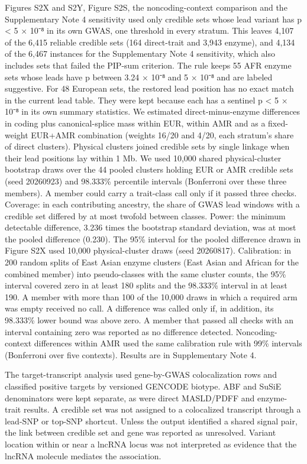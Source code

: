 Figures S2X and S2Y, Figure S2S, the noncoding-context comparison and the Supplementary Note 4 sensitivity used only credible sets whose lead variant has p \textless{} 5 × 10⁻⁸ in its own GWAS, one threshold in every stratum. This leaves 4,107 of the 6,415 reliable credible sets (164 direct-trait and 3,943 enzyme), and 4,134 of the 6,467 instances for the Supplementary Note 4 sensitivity, which also includes sets that failed the PIP-sum criterion. The rule keeps 55 AFR enzyme sets whose leads have p between 3.24 × 10⁻⁸ and 5 × 10⁻⁸ and are labeled suggestive. For 48 European sets, the restored lead position has no exact match in the current lead table. They were kept because each has a sentinel p \textless{} 5 × 10⁻⁸ in its own summary statistics. We estimated direct-minus-enzyme differences in coding plus canonical-splice mass within EUR, within AMR and as a fixed-weight EUR+AMR combination (weights 16/20 and 4/20, each stratum's share of direct clusters). Physical clusters joined credible sets by single linkage when their lead positions lay within 1 Mb. We used 10,000 shared physical-cluster bootstrap draws over the 44 pooled clusters holding EUR or AMR credible sets (seed 20260923) and 98.333\% percentile intervals (Bonferroni over these three members). A member could carry a trait-class call only if it passed three checks. Coverage: in each contributing ancestry, the share of GWAS lead windows with a credible set differed by at most twofold between classes. Power: the minimum detectable difference, 3.236 times the bootstrap standard deviation, was at most the pooled difference (0.230). The 95\% interval for the pooled difference drawn in Figure S2X used 10,000 physical-cluster draws (seed 20260817). Calibration: in 200 random splits of East Asian enzyme clusters (East Asian and African for the combined member) into pseudo-classes with the same cluster counts, the 95\% interval covered zero in at least 180 splits and the 98.333\% interval in at least 190. A member with more than 100 of the 10,000 draws in which a required arm was empty received no call. A difference was called only if, in addition, its 98.333\% lower bound was above zero. A member that passed all checks with an interval containing zero was reported as no difference detected. Noncoding-context differences within AMR used the same calibration rule with 99\% intervals (Bonferroni over five contexts). Results are in Supplementary Note 4.

The target-transcript analysis used gene-by-GWAS colocalization rows and classified positive targets by versioned GENCODE biotype. ABF and SuSiE denominators were kept separate, as were direct MASLD/PDFF and enzyme-trait results. A credible set was not assigned to a colocalized transcript through a lead-SNP or top-SNP shortcut. Unless the output identified a shared signal pair, the link between credible set and gene was reported as unresolved. Variant location within or near a lncRNA locus was not interpreted as evidence that the lncRNA molecule mediates the association.

